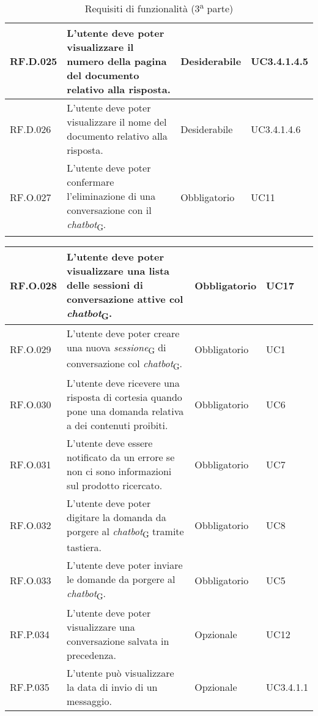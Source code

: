 \begin{table}[H]
\begin{tabular}{|C{2.7cm}|L{6.5cm}|C{2.7cm}|C{2.7cm}|}
         \hline
        RF.D.025 & L’utente deve poter visualizzare il numero della pagina del documento relativo alla risposta.
        & Desiderabile & UC3.4.1.4.5 \\
        \hline
        RF.D.026 & L’utente deve poter visualizzare il nome del documento relativo alla
        risposta.
         & Desiderabile & UC3.4.1.4.6 \\
        \hline
        RF.O.027 & L’utente deve poter confermare l'eliminazione di una conversazione con il \textit{chatbot}\textsubscript{G}.
         & Obbligatorio & UC11 \\
        \hline
    \end{tabular}
    \caption{Requisiti di funzionalità (3\textsuperscript{a}  parte)}
\end{table}
\begin{table}[H]
\centering
    \begin{tabular}{|C{2.7cm}|L{6.5cm}|C{2.7cm}|C{2.7cm}|}
        \hline
        RF.O.028 & L’utente deve poter visualizzare una lista delle
        sessioni di conversazione attive col \textit{chatbot}\textsubscript{G}.
         & Obbligatorio & UC17 \\
        \hline
        RF.O.029 & L’utente deve poter creare una nuova \textit{sessione}\textsubscript{G} di conversazione col \textit{chatbot}\textsubscript{G}.
         & Obbligatorio & UC1 \\
        \hline
        RF.O.030 & L’utente deve ricevere una risposta di cortesia quando pone una domanda relativa a dei contenuti proibiti.
         & Obbligatorio & UC6 \\
        \hline
        RF.O.031 & L'utente deve essere notificato da un errore se non ci sono informazioni sul prodotto ricercato. & Obbligatorio & UC7 \\
        \hline
        RF.O.032 & L’utente deve poter digitare la domanda da porgere al \textit{chatbot}\textsubscript{G} tramite tastiera.
         & Obbligatorio & UC8 \\
        \hline
        RF.O.033 & L’utente deve poter inviare le domande da porgere al \textit{chatbot}\textsubscript{G}.
         & Obbligatorio & UC5 \\
        \hline
        RF.P.034 & L’utente deve poter visualizzare una conversazione salvata in precedenza.
         & Opzionale & UC12 \\
        \hline
        RF.P.035 & L’utente può visualizzare la data di invio di un messaggio.
         & Opzionale & UC3.4.1.1 \\

\end{tabular}
\end{table}
